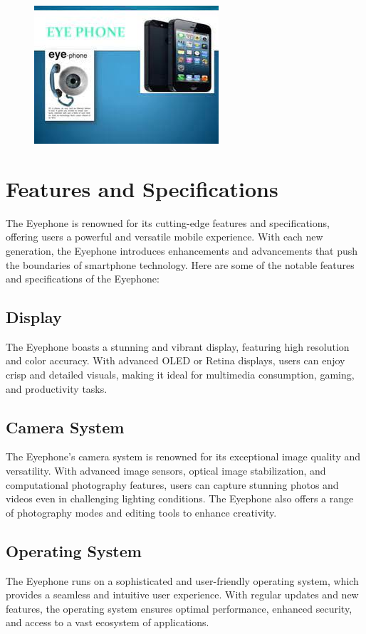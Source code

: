 \documentclass[a4paper,11pt]{report}
\begin{document}
\begin{figure}[h]
	\centering
	\hspace{21pt}
	\includegraphics[width=.70\linewidth]{eyephone1.jpg}
\end{figure}

\chapter{Features and Specifications}

The Eyephone is renowned for its cutting-edge features and specifications, offering users a powerful and versatile mobile experience. With each new generation, the Eyephone introduces enhancements and advancements that push the boundaries of smartphone technology. Here are some of the notable features and specifications of the Eyephone:

\section{Display} 
The Eyephone boasts a stunning and vibrant display, featuring high resolution and color accuracy. With advanced OLED or Retina displays, users can enjoy crisp and detailed visuals, making it ideal for multimedia consumption, gaming, and productivity tasks.
\section{Camera System}
The Eyephone's camera system is renowned for its exceptional image quality and versatility. With advanced image sensors, optical image stabilization, and computational photography features, users can capture stunning photos and videos even in challenging lighting conditions. The Eyephone also offers a range of photography modes and editing tools to enhance creativity.
\section{Operating System}
The Eyephone runs on a sophisticated and user-friendly operating system, which provides a seamless and intuitive user experience. With regular updates and new features, the operating system ensures optimal performance, enhanced security, and access to a vast ecosystem of applications.
\end{document}
